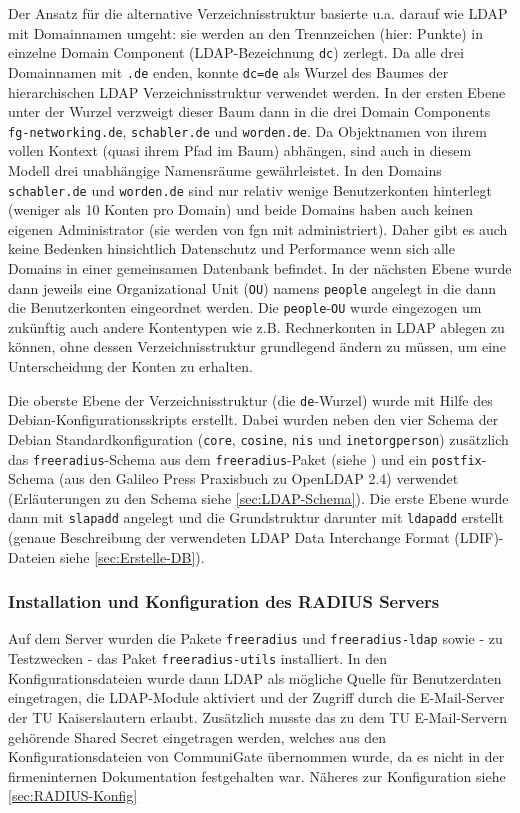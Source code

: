\documentclass[11pt,a4paper,titlepage=firstiscover,headsepline,bibtotoc]{scrartcl} %
\begin{document}
Der Ansatz für die alternative Verzeichnisstruktur basierte u.a. darauf wie LDAP mit Domainnamen umgeht: sie werden an den Trennzeichen (hier: Punkte) in einzelne Domain Component (LDAP-Bezeichnung \texttt{dc}) zerlegt. Da alle drei Domainnamen mit \texttt{.de} enden, konnte \texttt{dc=de} als Wurzel des Baumes der hierarchischen LDAP Verzeichnisstruktur verwendet werden. In der ersten Ebene unter der Wurzel verzweigt dieser Baum dann in die drei Domain Components  \texttt{fg-networking.de}, \texttt{schabler.de} und \texttt{worden.de}. Da Objektnamen von ihrem vollen Kontext (quasi ihrem Pfad im Baum) abhängen, sind auch in diesem Modell drei unabhängige Namensräume gewährleistet. In den Domains \texttt{schabler.de} und \texttt{worden.de} sind nur relativ wenige Benutzerkonten hinterlegt (weniger als 10 Konten pro Domain) und beide Domains haben auch keinen eigenen Administrator (sie werden von fgn mit administriert). Daher gibt es auch keine Bedenken hinsichtlich Datenschutz und Performance wenn sich alle Domains in einer gemeinsamen Datenbank befindet. In der nächsten Ebene wurde dann jeweils eine Organizational Unit (\texttt{OU}) namens \texttt{people} angelegt in die dann die Benutzerkonten eingeordnet werden. Die \texttt{people}-\texttt{OU} wurde eingezogen um zukünftig auch andere Kontentypen wie z.B. Rechnerkonten in LDAP ablegen zu können, ohne dessen Verzeichnisstruktur grundlegend ändern zu müssen, um eine Unterscheidung der Konten zu erhalten.

Die oberste Ebene der Verzeichnisstruktur (die \texttt{de}-Wurzel) wurde mit Hilfe des Debian-Konfigurationsskripts erstellt. Dabei wurden neben den vier Schema der Debian Standardkonfiguration (\texttt{core}, \texttt{cosine}, \texttt{nis} und \texttt{inetorgperson}) zusätzlich das \texttt{freeradius}-Schema aus dem \texttt{freeradius}-Paket (siehe ) und ein \texttt{postfix}-Schema (aus den Galileo Press Praxisbuch zu OpenLDAP 2.4) verwendet (Erläuterungen zu den Schema siehe \autoref{sec:LDAP-Schema}). Die erste Ebene wurde dann mit \texttt{slapadd} angelegt und die Grundstruktur darunter mit \texttt{ldapadd} erstellt (genaue Beschreibung der verwendeten LDAP Data Interchange Format (LDIF)-Dateien siehe \autoref{sec:Erstelle-DB}).

\subsubsection{Installation und Konfiguration des RADIUS Servers}\label{sec:RADIUS-Konf}
Auf dem Server wurden die Pakete \texttt{freeradius} und \texttt{freeradius-ldap} sowie - zu Testzwecken - das Paket \texttt{freeradius-utils} installiert. In den Konfigurationsdateien wurde dann LDAP als mögliche Quelle für Benutzerdaten eingetragen, die LDAP-Module aktiviert und der Zugriff durch die E-Mail-Server der TU Kaiserslautern erlaubt. Zusätzlich musste das zu dem TU E-Mail-Servern gehörende Shared Secret eingetragen werden, welches aus den Konfigurationsdateien von CommuniGate übernommen wurde, da es nicht in der firmeninternen Dokumentation festgehalten war. Näheres zur Konfiguration siehe \autoref{sec:RADIUS-Konfig}
\end{document}
